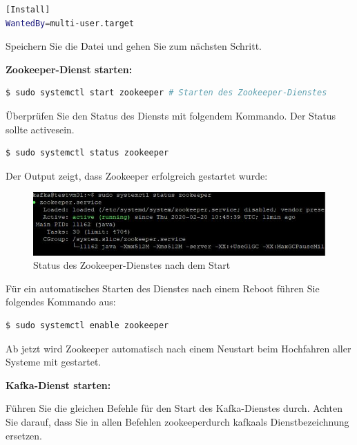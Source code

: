 \documentclass[a4paper,titlepage,halfparskip,12pt]{scrreprt}
\begin{document}
\begin{onehalfspacing}
\begin{lstlisting}[language=Bash]
[Install]
WantedBy=multi-user.target
\end{lstlisting}

Speichern Sie die Datei und gehen Sie zum nächsten Schritt.

\textbf{Zookeeper-Dienst starten:}

\bigskip

\begin{lstlisting}[language=Bash]
$ sudo systemctl start zookeeper # Starten des Zookeeper-Dienstes
\end{lstlisting}

Überprüfen Sie den Status des Diensts mit folgendem Kommando. Der Status sollte \glqq active\grqq sein.

\smallskip

\begin{lstlisting}[language=Bash]
$ sudo systemctl status zookeeper
\end{lstlisting}

Der Output zeigt, dass Zookeeper erfolgreich gestartet wurde:

\begin{figure}[h]
	\centering
	\includegraphics{images/StatusZookeeper}
	\caption{Status des Zookeeper-Dienstes nach dem Start}
	\label{img:StatusZookeeper}
\end{figure}

Für ein automatisches Starten des Dienstes nach einem Reboot führen Sie folgendes Kommando aus:

\smallskip

\begin{lstlisting}[language=Bash]
$ sudo systemctl enable zookeeper
\end{lstlisting}

Ab jetzt wird Zookeeper automatisch nach einem Neustart beim Hochfahren aller Systeme mit gestartet.

\textbf{Kafka-Dienst starten:}

\bigskip

Führen Sie die gleichen Befehle für den Start des Kafka-Dienstes durch. Achten Sie darauf, dass Sie in allen Befehlen \glqq zookeeper\grqq durch \glqq kafka\grqq als Dienstbezeichnung ersetzen.


\end{onehalfspacing}
\end{document}
